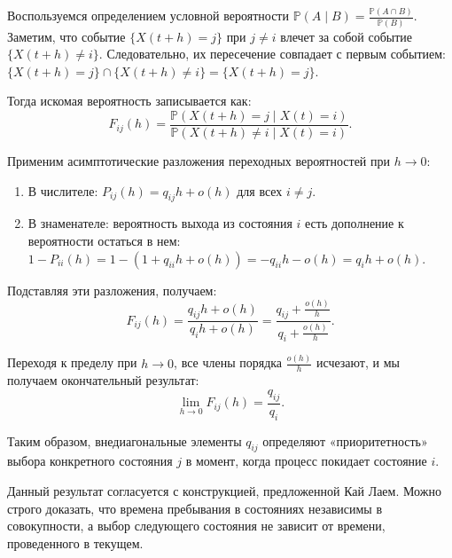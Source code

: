 \begin{sproof}
    Воспользуемся определением условной вероятности $\mathbb{P}(A \mid B) = \frac{\mathbb{P}(A \cap B)}{\mathbb{P}(B)}$. 
    Заметим, что событие $\{X(t+h) = j\}$ при $j \neq i$ влечет за собой событие $\{X(t+h) \neq i\}$. Следовательно, их пересечение совпадает с первым событием: $\{X(t+h) = j\} \cap \{X(t+h) \neq i\} = \{X(t+h) = j\}$.
    
    Тогда искомая вероятность записывается как:
    \begin{equation}
        F_{ij}(h) = \frac{\mathbb{P}(X(t+h) = j \mid X(t) = i)}{\mathbb{P}(X(t+h) \neq i \mid X(t) = i)}.
    \end{equation}
    
    Применим асимптотические разложения переходных вероятностей при $h \to 0$:
    \begin{enumerate}
        \item В числителе: $P_{ij}(h) = q_{ij} h + o(h)$ для всех $i \neq j$.
        \item В знаменателе: вероятность выхода из состояния $i$ есть дополнение к вероятности остаться в нем:
        $1 - P_{ii}(h) = 1 - (1 + q_{ii} h + o(h)) = -q_{ii} h - o(h) = q_i h + o(h)$.
    \end{enumerate}
    
    Подставляя эти разложения, получаем:
    \begin{equation}
        F_{ij}(h) = \frac{q_{ij} h + o(h)}{q_i h + o(h)} = \frac{q_{ij} + \frac{o(h)}{h}}{q_i + \frac{o(h)}{h}}.
    \end{equation}
    
    Переходя к пределу при $h \to 0$, все члены порядка $\frac{o(h)}{h}$ исчезают, и мы получаем окончательный результат:
    \begin{equation}
        \lim_{h \to 0} F_{ij}(h) = \frac{q_{ij}}{q_i}.
    \end{equation}
\end{sproof}

Таким образом, внедиагональные элементы $q_{ij}$ определяют «приоритетность» выбора конкретного состояния $j$ в момент, когда процесс покидает состояние $i$.

\begin{note}
    Данный результат согласуется с конструкцией, предложенной Кай Лаем. Можно строго доказать, что времена пребывания в состояниях независимы в совокупности, а выбор следующего состояния не зависит от времени, проведенного в текущем.
\end{note}

